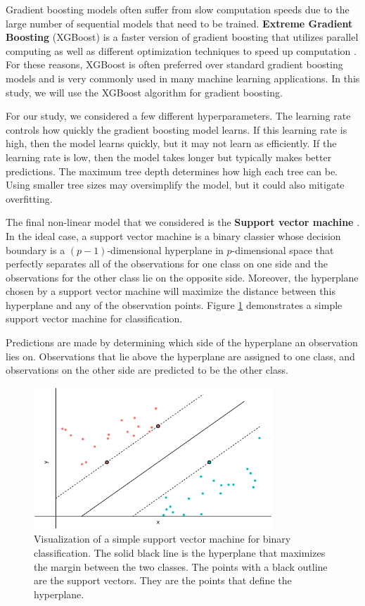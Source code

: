\documentclass{article}
\begin{document}
Gradient boosting models often suffer from slow computation speeds due to the large number of sequential models that need to be trained. \textbf{Extreme Gradient Boosting} (XGBoost) is a faster version of gradient boosting that utilizes parallel computing as well as different optimization techniques to speed up computation \cite{chen2016xgboost}. For these reasons, XGBoost is often preferred over standard gradient boosting models and is very commonly used in many machine learning applications. In this study, we will use the XGBoost algorithm for gradient boosting.

For our study, we considered a few different hyperparameters. The learning rate controls how quickly the gradient boosting model learns. If this learning rate is high, then the model learns quickly, but it may not learn as efficiently. If the learning rate is low, then the model takes longer but typically makes better predictions. The maximum tree depth determines how high each tree can be. Using smaller tree sizes may oversimplify the model, but it could also mitigate overfitting.

The final non-linear model that we considered is the \textbf{Support vector machine} \cite{cortes1995support}. In the ideal case, a support vector machine is a binary classier whose decision boundary is a $(p-1)$-dimensional hyperplane in $p$-dimensional space that perfectly separates all of the observations for one class on one side and the observations for the other class lie on the opposite side. Moreover, the hyperplane chosen by a support vector machine will maximize the distance between this hyperplane and any of the observation points. Figure \ref{fig:svm} demonstrates a simple support vector machine for classification. 

Predictions are made by determining which side of the hyperplane an observation lies on. Observations that lie above the hyperplane are assigned to one class, and observations on the other side are predicted to be the other class.

\begin{figure}[t!]
	\centering
	\includegraphics[width = 0.8\textwidth]{images/svm.eps}
	\captionsetup{width = 0.8\textwidth}
	\caption{Visualization of a simple support vector machine for binary classification. The solid black line is the hyperplane that maximizes the margin between the two classes. The points with a black outline are the support vectors. They are the points that define the hyperplane.}
	\label{fig:svm}
\end{figure}
\end{document}
